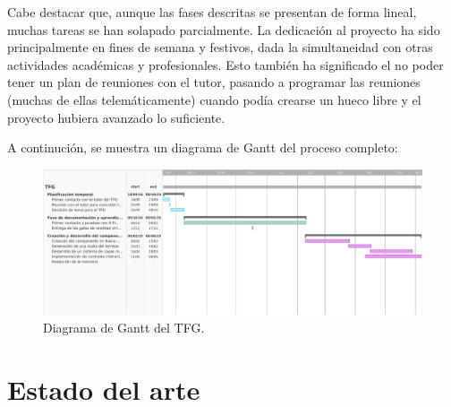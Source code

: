 \documentclass[a4paper, 12pt]{book}
\begin{document}
Cabe destacar que, aunque las fases descritas se presentan de forma lineal, muchas tareas se han solapado parcialmente. La dedicación al proyecto ha sido principalmente en fines de semana y festivos, dada la simultaneidad con otras actividades académicas y profesionales. Esto también ha significado el no poder tener un plan de reuniones con el tutor, pasando a programar las reuniones (muchas de ellas telemáticamente) cuando podía crearse un hueco libre y el proyecto hubiera avanzado lo suficiente.

A continución, se muestra un diagrama de Gantt del proceso completo:

\begin{figure}[H]
  \centering
  \includegraphics[width=\textwidth]{img/gantt.png}
  \caption{Diagrama de Gantt del TFG.}
  \label{fig:gantt}
\end{figure}


\cleardoublepage
\chapter{Estado del arte}
\label{chap:estado}


\end{document}
